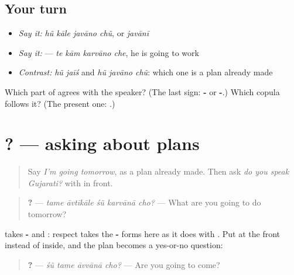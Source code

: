 \subsection*{Your turn}
\begin{itemize}
\raggedright
  \item \emph{Say it:} \emph{hũ kāle javāno chũ}, or \emph{javānī}
  \item \emph{Say it:} \textbf{   } — \emph{te kām karvāno che}, he is going to work
  \item \emph{Contrast:} \emph{hũ jaīś} and \emph{hũ javāno chũ}: which one is a plan already made
\end{itemize}

\begin{tcolorbox}[breakable,colback=teal!4,colframe=teal!35!black,title={Before you move on}]
Which part of \textbf{} agrees with the speaker? (The last sign: \textbf{-} or \textbf{-}.) Which copula follows it? (The present one: \textbf{}.)
\end{tcolorbox}
\section[\texorpdfstring{\gu{શું} \gu{કરવાના} \gu{છો}? (śũ karvānā cho?)}{શું કરવાના છો? (śũ karvānā cho?)}]{   ? — asking about plans}

\label{lesson:GU-C150-karvana-cho}



\begin{quote}
Say \emph{I'm going tomorrow}, as a plan already made. Then ask \emph{do you speak Gujarati?} with \textbf{} in front.
\end{quote}

\begin{grammarlens}[title={Grammar Lens: the question}]
\begin{quote}
\textbf{    ?} — \emph{tame āvtīkāle śũ karvānā cho?} — What are you going to do tomorrow?
\end{quote}

\textbf{} takes \textbf{-} and \textbf{}: respect takes the \textbf{-} forms here as it does with \textbf{ }. Put \textbf{} at the front instead of inside, and the plan becomes a yes-or-no question:

\begin{quote}
\textbf{   ?} — \emph{śũ tame āvvānā cho?} — Are you going to come?
\end{quote}
\end{grammarlens}


